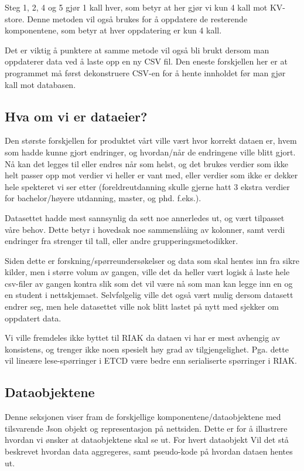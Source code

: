 Steg 1, 2, 4 og 5 gjør 1 kall hver, som betyr at her gjør vi kun 4 kall mot KV-store. Denne metoden vil også brukes for å oppdatere de resterende komponentene, som betyr at hver oppdatering er kun 4 kall.

Det er viktig å punktere at samme metode vil også bli brukt dersom man oppdaterer data ved å laste 
opp en ny CSV fil. Den eneste forskjellen her er at programmet må først dekonstruere CSV-en for å hente innholdet før man gjør kall mot databasen.

\subsection{Hva om vi er dataeier?}
Den største forskjellen for produktet vårt ville vært hvor korrekt dataen er, hvem som hadde kunne gjort endringer, og hvordan/når de endringene ville blitt gjort. Nå kan det legges til eller endres når som helst, og det brukes verdier som ikke helt passer opp mot verdier vi heller er vant med, eller verdier som ikke er dekker hele spekteret vi ser etter (foreldreutdanning skulle gjerne hatt 3 ekstra verdier for bachelor/høyere utdanning, master, og phd. f.eks.).

Datasettet hadde mest sannsynlig da sett noe annerledes ut, og vært tilpasset våre behov. Dette betyr i hovedsak noe sammenslåing av kolonner, samt verdi endringer fra strenger til tall, eller andre grupperingsmetodikker.

Siden dette er forskning/spørreundersøkelser og data som skal hentes inn fra sikre kilder, men i større volum av gangen, ville det da heller vært logisk å laste hele csv-filer av gangen kontra slik som det vil være nå som man kan legge inn en og en student i nettskjemaet. Selvfølgelig ville det også vært mulig dersom datasett endrer seg, men hele datasettet ville nok blitt lastet på nytt med sjekker om oppdatert data.

Vi ville fremdeles ikke byttet til RIAK da dataen vi har er mest avhengig av konsistens, og trenger ikke noen spesielt høy grad av tilgjengelighet. Pga. dette vil lineære lese-spørringer i ETCD være bedre enn serialiserte spørringer i RIAK.

\subsection{Dataobjektene}
Denne seksjonen viser fram de forskjellige komponentene/dataobjektene med tilsvarende Json objekt og representasjon på nettsiden. Dette er for å illustrere hvordan vi ønsker at dataobjektene skal se ut. For hvert dataobjekt Vil det stå beskrevet hvordan data aggregeres, samt pseudo-kode på hvordan dataen hentes ut.

